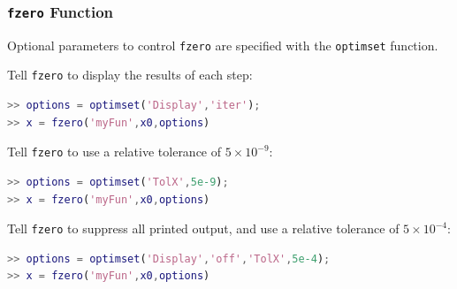 \documentclass[10pt]{beamer}
\begin{document}
\begin{frame}[fragile]
\frametitle{\texttt{fzero} Function}

Optional parameters to control \texttt{fzero} are specified with
the \texttt{optimset} function.

\bigskip
Tell \texttt{fzero} to display the results of each step:
\vspace{0.0cm}
\begin{lstlisting}[language=matlab]
>> options = optimset('Display','iter');
>> x = fzero('myFun',x0,options)
\end{lstlisting}

\vspace{3ex}

Tell \texttt{fzero} to use a relative tolerance of $5\times10^{-9}$:
\vspace{0.0cm}
\begin{lstlisting}[language=matlab]
>> options = optimset('TolX',5e-9);
>> x = fzero('myFun',x0,options)
\end{lstlisting}

\vspace{3ex}

Tell \texttt{fzero} to suppress all printed output, and
use a relative tolerance of $5\times10^{-4}$:
\vspace{0.0cm}
\begin{lstlisting}[language=matlab]
>> options = optimset('Display','off','TolX',5e-4);
>> x = fzero('myFun',x0,options)
\end{lstlisting}

\end{frame}
\end{document}
